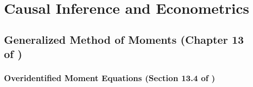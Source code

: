 %
%
%
%
%
%
%
%
%
%
%
%
%

\chapter{Causal Inference and Econometrics}






\section{Generalized Method of Moments (Chapter 13 of \citet{hansen2020})}

\subsection{Overidentified Moment Equations (Section 13.4 of \citet{hansen2020})}\label{sec.overid.gmm}

